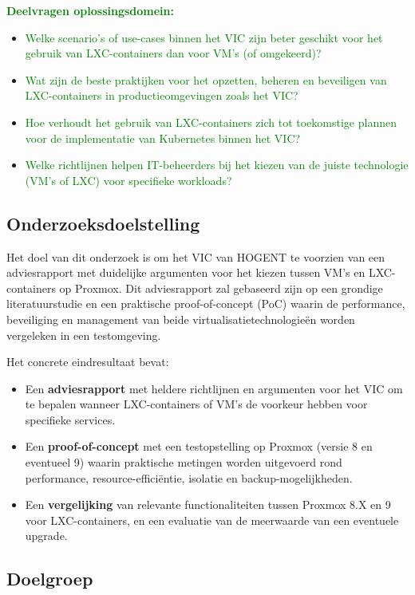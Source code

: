 \textcolor{green}{\textbf{Deelvragen oplossingsdomein:}}
\begin{itemize}
    \item \textcolor{green}{Welke scenario's of use-cases binnen het VIC zijn beter geschikt voor het gebruik van LXC-containers dan voor VM's (of omgekeerd)?}
    \item \textcolor{green}{Wat zijn de beste praktijken voor het opzetten, beheren en beveiligen van LXC-containers in productieomgevingen zoals het VIC?}
    \item \textcolor{green}{Hoe verhoudt het gebruik van LXC-containers zich tot toekomstige plannen voor de implementatie van Kubernetes binnen het VIC?}
    \item \textcolor{green}{Welke richtlijnen helpen IT-beheerders bij het kiezen van de juiste technologie (VM's of LXC) voor specifieke workloads?}
\end{itemize}



\subsection{Onderzoeksdoelstelling}

Het doel van dit onderzoek is om het VIC van HOGENT te voorzien van een adviesrapport met duidelijke argumenten voor het kiezen tussen VM's en LXC-containers op Proxmox. Dit adviesrapport zal gebaseerd zijn op een grondige literatuurstudie en een praktische proof-of-concept (PoC) waarin de performance, beveiliging en management van beide virtualisatietechnologieën worden vergeleken in een testomgeving.

Het concrete eindresultaat bevat:
\begin{itemize}
    \item Een \textbf{adviesrapport} met heldere richtlijnen en argumenten voor het VIC om te bepalen wanneer LXC-containers of VM's de voorkeur hebben voor specifieke services.
    \item Een \textbf{proof-of-concept} met een testopstelling op Proxmox (versie 8 en eventueel 9) waarin praktische metingen worden uitgevoerd rond performance, resource-efficiëntie, isolatie en backup-mogelijkheden.
    \item Een \textbf{vergelijking} van relevante functionaliteiten tussen Proxmox 8.X en 9 voor LXC-containers, en een evaluatie van de meerwaarde van een eventuele upgrade.
\end{itemize}

\subsection{Doelgroep}

